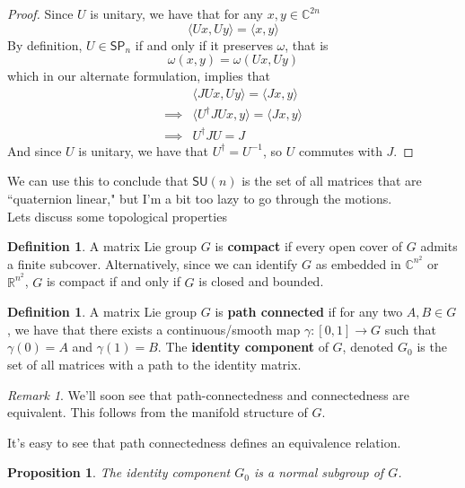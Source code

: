 \documentclass[psamsfonts]{amsart}
\newtheorem{prop}[thm]{Proposition}
\theoremstyle{definition}
\newtheorem{defn}[thm]{Definition}
\theoremstyle{remark}
\newtheorem*{rem*}{Remark}
\newcommand{\R}{\mathbb{R}}
\newcommand{\C}{\mathbb{C}}
\newcommand{\SP}{\mathsf{SP}}
\newcommand{\SU}{\mathsf{SU}}
\newcommand{\inv}{^{-1}}
\begin{document}
\begin{proof}
Since $U$ is unitary, we have that for any $x,y \in \C^{2n}$
$$\langle Ux, Uy \rangle = \langle x, y \rangle $$
By definition, $U \in \SP_n$ if and only if it preserves $\omega$, that is
$$\omega(x,y) = \omega(Ux,Uy) $$
which in our alternate formulation, implies that
\begin{align*}
&\langle JUx, Uy \rangle = \langle Jx, y \rangle \\
\implies &\langle U^\dagger JUx, y \rangle = \langle Jx, y \rangle \\
\implies & U^\dagger J U = J
\end{align*}
And since $U$ is unitary, we have that $U^\dagger = U \inv$, so $U$ commutes with $J$.
\end{proof}

We can use this to conclude that $\SU(n)$ is the set of all matrices that are ``quaternion linear," but I'm a bit too lazy to go through the motions.\\

Lets discuss some topological properties
\begin{defn}
A matrix Lie group $G$ is \textbf{compact} if every open cover of $G$ admits a finite subcover. Alternatively, since we can identify $G$ as embedded in $\C^{n^2}$ or $\R^{n^2}$, $G$ is compact if and only if $G$ is closed and bounded.
\end{defn}

\begin{defn}
A matrix Lie group $G$ is \textbf{path connected} if for any two $A,B \in G$, we have that there exists a continuous/smooth map $\gamma: [0,1] \to G$ such that $\gamma(0) = A$ and $\gamma(1) = B$. The \textbf{identity component} of $G$, denoted $G_0$ is the set of all matrices with a path to the identity matrix.
\end{defn}
\begin{rem*}
We'll soon see that path-connectedness and connectedness are equivalent. This follows from the manifold structure of $G$.
\end{rem*}

It's easy to see that path connectedness defines an equivalence relation.
\begin{prop}
The identity component $G_0$ is a normal subgroup of $G$.
\end{prop}
\end{document}
